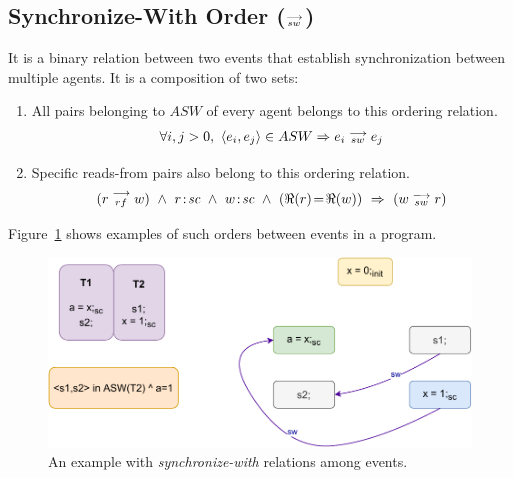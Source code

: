     \subsection{Synchronize-With Order ($\stackrel{\longrightarrow}{_{sw}} $)}
        It is a binary relation between two events that establish synchronization between multiple agents. 
        It is a composition of two sets: 
        \begin{enumerate}
            \item All pairs belonging to $ASW$ of every agent belongs to this ordering relation. 
                \begin{align*}
                    \forall{i, j > 0}, \ \langle e_i, e_j \rangle \in ASW \Rightarrow{} e_i\stackrel{\longrightarrow}{_{sw}}e_j 
                \end{align*}
                    
            \item Specific reads-from pairs also belong to this ordering relation\footnotemark. 
                \begin{align*}
                    (\reln{r}{rf}{w}) \ \wedge \ \et{r}{sc} \ \wedge \ \et{w}{sc} \ \wedge \ (\Re(r)\!=\!\Re(w)) \ \Rightarrow{} \
                    (\reln{w}{sw}{r})
                \end{align*}            
        \end{enumerate}
        Figure~\ref{model:sync-with} shows examples of such orders between events in a program. 
        \begin{figure}[H]
            \centering
            \includegraphics[scale=0.7]{4.ECMAScriptMemoryModel/SynchronizeWith.pdf}
            \caption{An example with \textit{synchronize-with} relations among events.}
            \label{model:sync-with}
        \end{figure}

        
